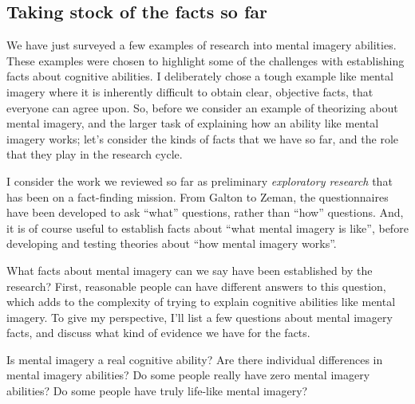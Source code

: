 \documentclass[
  oneside,
  12pt]{crumpbook}
\begin{document}
\hypertarget{taking-stock-of-the-facts-so-far}{%
\subsection{Taking stock of the facts so far}\label{taking-stock-of-the-facts-so-far}}

We have just surveyed a few examples of research into mental imagery abilities. These examples were chosen to highlight some of the challenges with establishing facts about cognitive abilities. I deliberately chose a tough example like mental imagery where it is inherently difficult to obtain clear, objective facts, that everyone can agree upon. So, before we consider an example of theorizing about mental imagery, and the larger task of explaining how an ability like mental imagery works; let's consider the kinds of facts that we have so far, and the role that they play in the research cycle.

I consider the work we reviewed so far as preliminary \emph{exploratory research} that has been on a fact-finding mission. From Galton to Zeman, the questionnaires have been developed to ask ``what'' questions, rather than ``how'' questions. And, it is of course useful to establish facts about ``what mental imagery is like'', before developing and testing theories about ``how mental imagery works''.

What facts about mental imagery can we say have been established by the research? First, reasonable people can have different answers to this question, which adds to the complexity of trying to explain cognitive abilities like mental imagery. To give my perspective, I'll list a few questions about mental imagery facts, and discuss what kind of evidence we have for the facts.

Is mental imagery a real cognitive ability? Are there individual differences in mental imagery abilities? Do some people really have zero mental imagery abilities? Do some people have truly life-like mental imagery?
\end{document}
